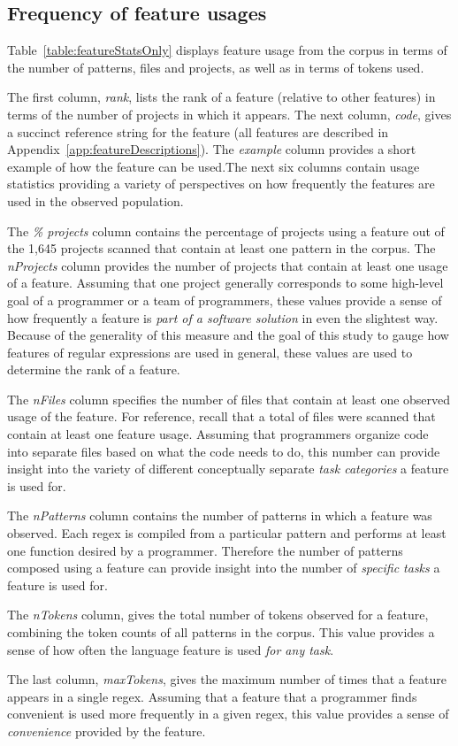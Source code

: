 \subsection{Frequency of feature usages}


\label{sec:featureResults}
Table~\ref{table:featureStatsOnly} displays feature usage from the corpus in terms of the number of patterns, files and projects, as well as in terms of tokens used.

The first column, \emph{rank}, lists the rank of a feature (relative to other features) in terms of the number of projects in which it appears. The next column, \emph{code}, gives a succinct reference string for the feature (all features are described in Appendix~\ref{app:featureDescriptions}). The \emph{example} column provides a short example of how the feature can be used.The next six columns contain usage statistics providing a variety of perspectives on how frequently the features are used in the observed population.

The \emph{\% projects} column contains the percentage of projects  using a feature out of the 1,645 projects scanned that contain at least one pattern in the corpus.  The \emph{nProjects} column provides the number of projects that contain at least one usage of a feature.  Assuming that one project generally corresponds to some high-level goal of a programmer or a team of programmers, these values provide a sense of how frequently a feature is \emph{part of a software solution} in even the slightest way.  Because of the generality of this measure and the goal of this study to gauge how features of regular expressions are used in general, these values are used to determine the rank of a feature.

The \emph{nFiles} column specifies the number of files that contain at least one observed usage of the feature.  For reference, recall that a total of  files were scanned that contain at least one feature usage.  Assuming that programmers organize code into separate files based on what the code needs to do, this number can provide insight into the variety of different conceptually separate \emph{task categories} a feature is used for.

The \emph{nPatterns} column contains the number of patterns in which a feature was observed. Each regex is compiled from a particular pattern and performs at least one function desired by a programmer.  Therefore the number of patterns composed using a feature can provide insight into the number of \emph{specific tasks} a feature is used for.

The \emph{nTokens} column, gives the total number of tokens observed for a feature, combining the token counts of all patterns in the corpus.  This value provides a sense of how often the language feature is used \emph{for any task}.

The last column, \emph{maxTokens}, gives the maximum number of times that a feature appears in a single regex.  Assuming that a feature that a programmer finds convenient is used more frequently in a given regex, this value provides a sense of \emph{convenience} provided by the feature.
